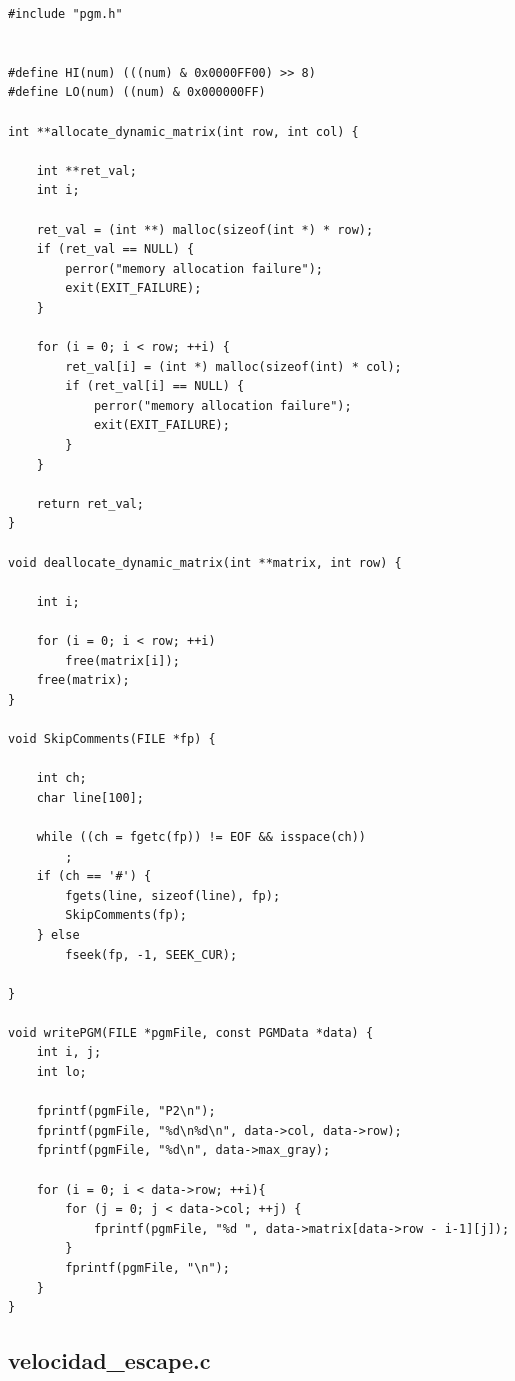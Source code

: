 \documentclass[a4paper,10pt]{article}
\begin{document}
\begin{verbatim}
#include "pgm.h"


#define HI(num)	(((num) & 0x0000FF00) >> 8)
#define LO(num)	((num) & 0x000000FF)

int **allocate_dynamic_matrix(int row, int col) {

	int **ret_val;
	int i;

	ret_val = (int **) malloc(sizeof(int *) * row);
	if (ret_val == NULL) {
		perror("memory allocation failure");
		exit(EXIT_FAILURE);
	}

	for (i = 0; i < row; ++i) {
		ret_val[i] = (int *) malloc(sizeof(int) * col);
		if (ret_val[i] == NULL) {
			perror("memory allocation failure");
			exit(EXIT_FAILURE);
		}
	}

	return ret_val;
}

void deallocate_dynamic_matrix(int **matrix, int row) {

	int i;

	for (i = 0; i < row; ++i)
		free(matrix[i]);
	free(matrix);
}

void SkipComments(FILE *fp) {

	int ch;
	char line[100];

	while ((ch = fgetc(fp)) != EOF && isspace(ch))
		;
	if (ch == '#') {
		fgets(line, sizeof(line), fp);
		SkipComments(fp);
	} else
		fseek(fp, -1, SEEK_CUR);

}

void writePGM(FILE *pgmFile, const PGMData *data) {
	int i, j;
	int lo;

	fprintf(pgmFile, "P2\n");
	fprintf(pgmFile, "%d\n%d\n", data->col, data->row);
	fprintf(pgmFile, "%d\n", data->max_gray);

	for (i = 0; i < data->row; ++i){
		for (j = 0; j < data->col; ++j) {
            fprintf(pgmFile, "%d ", data->matrix[data->row - i-1][j]);
		}
		fprintf(pgmFile, "\n");
	}
}

\end{verbatim}

\subsection{velocidad\_escape.c}
\end{document}
